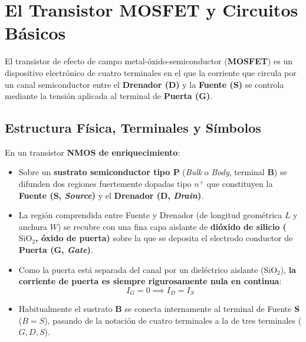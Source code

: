 \section{El Transistor MOSFET y Circuitos Básicos}

El transistor de efecto de campo metal-óxido-semiconductor (\textbf{MOSFET}) es un dispositivo electrónico de cuatro terminales en el que la corriente que circula por un canal semiconductor entre el \textbf{Drenador (D)} y la \textbf{Fuente (S)} se controla mediante la tensión aplicada al terminal de \textbf{Puerta (G)}.

\subsection{Estructura Física, Terminales y Símbolos}
En un transistor \textbf{NMOS de enriquecimiento}:
\begin{itemize}[leftmargin=*]
    \item Sobre un \textbf{sustrato semiconductor tipo P} (\textit{Bulk} o \textit{Body}, terminal \textbf{B}) se difunden dos regiones fuertemente dopadas tipo $n^+$ que constituyen la \textbf{Fuente (S, \textit{Source})} y el \textbf{Drenador (D, \textit{Drain})}.
    \item La región comprendida entre Fuente y Drenador (de longitud geométrica $L$ y anchura $W$) se recubre con una fina capa aislante de \textbf{dióxido de silicio ($\text{SiO}_2$, óxido de puerta)} sobre la que se deposita el electrodo conductor de \textbf{Puerta (G, \textit{Gate})}.
    \item Como la puerta está separada del canal por un dieléctrico aislante ($\text{SiO}_2$), \textbf{la corriente de puerta es siempre rigurosamente nula en continua}:
    \begin{equation}
        I_G = 0 \implies I_D = I_S
    \end{equation}
    \item Habitualmente el sustrato \textbf{B} se conecta internamente al terminal de Fuente \textbf{S} ($B = S$), pasando de la notación de cuatro terminales a la de tres terminales ($G, D, S$).
\end{itemize}

